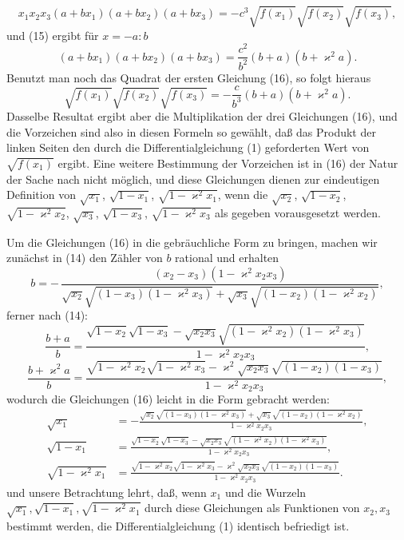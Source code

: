 \documentclass[11pt]{article}
\begin{document}
\[
x_1x_2x_3(a+bx_1)(a+bx_2)(a+bx_3)
=-c^3\sqrt{f(x_1)}\sqrt{f(x_2)}\sqrt{f(x_3)},
\]
und (15) ergibt für $x=-a:b$
\[
(a+bx_1)(a+bx_2)(a+bx_3)
=\frac{c^2}{b^2}(b+a)(b+\varkappa^2a).
\]
Benutzt man noch das Quadrat der ersten Gleichung (16), so folgt hieraus
\[
\sqrt{f(x_1)}\sqrt{f(x_2)}\sqrt{f(x_3)}
=
-\frac{c}{b^3}(b+a)(b+\varkappa^2a).
\]
Dasselbe Resultat ergibt aber die Multiplikation der drei Gleichungen (16), und die Vorzeichen sind also in diesen Formeln so gewählt, daß das Produkt der linken Seiten den durch die Differentialgleichung (1) geforderten Wert von $\sqrt{f(x_1)}$ ergibt. Eine weitere Bestimmung der Vorzeichen ist in (16) der Natur der Sache nach nicht möglich, und diese Gleichungen dienen zur eindeutigen Definition von $\sqrt{x_1}$, $\sqrt{1-x_1}$, $\sqrt{1-\varkappa^2x_1}$, wenn die $\sqrt{x_2}$, $\sqrt{1-x_2}$, $\sqrt{1-\varkappa^2x_2}$, $\sqrt{x_3}$, $\sqrt{1-x_3}$, $\sqrt{1-\varkappa^2x_3}$ als gegeben vorausgesetzt werden.

Um die Gleichungen (16) in die gebräuchliche Form zu bringen, machen wir zunächst in (14) den Zähler von $b$ rational und erhalten
\[
b=-\,\frac{(x_2-x_3)(1-\varkappa^2x_2x_3)}
{\sqrt{x_2}\sqrt{(1-x_3)(1-\varkappa^2x_3)}+
\sqrt{x_3}\sqrt{(1-x_2)(1-\varkappa^2x_2)}},
\]
ferner nach (14):
\[
\frac{b+a}{b}
=\frac{\sqrt{1-x_2}\sqrt{1-x_3}
-\sqrt{x_2x_3}\sqrt{(1-\varkappa^2x_2)(1-\varkappa^2x_3)}}
{1-\varkappa^2x_2x_3},
\]
\[
\frac{b+\varkappa^2a}{b}
=\frac{\sqrt{1-\varkappa^2x_2}\sqrt{1-\varkappa^2x_3}
-\varkappa^2\sqrt{x_2x_3}\sqrt{(1-x_2)(1-x_3)}}
{1-\varkappa^2x_2x_3},
\]
wodurch die Gleichungen (16) leicht in die Form gebracht werden:
\begin{equation}
\begin{aligned}
\sqrt{x_1}&=
-\frac{\sqrt{x_2}\sqrt{(1-x_3)(1-\varkappa^2x_3)}
+\sqrt{x_3}\sqrt{(1-x_2)(1-\varkappa^2x_2)}}
{1-\varkappa^2x_2x_3},\\
\sqrt{1-x_1}&=
\frac{\sqrt{1-x_2}\sqrt{1-x_3}
-\sqrt{x_2x_3}\sqrt{(1-\varkappa^2x_2)(1-\varkappa^2x_3)}}
{1-\varkappa^2x_2x_3},\\
\sqrt{1-\varkappa^2x_1}&=
\frac{\sqrt{1-\varkappa^2x_2}\sqrt{1-\varkappa^2x_3}
-\varkappa^2\sqrt{x_2x_3}\sqrt{(1-x_2)(1-x_3)}}
{1-\varkappa^2x_2x_3}.
\end{aligned}
\tag{17}
\end{equation}
und unsere Betrachtung lehrt, daß, wenn $x_1$ und die Wurzeln $\sqrt{x_1},\sqrt{1-x_1},\sqrt{1-\varkappa^2x_1}$ durch diese Gleichungen als Funktionen von $x_2,x_3$ bestimmt werden, die Differentialgleichung (1) identisch befriedigt ist.
\end{document}
